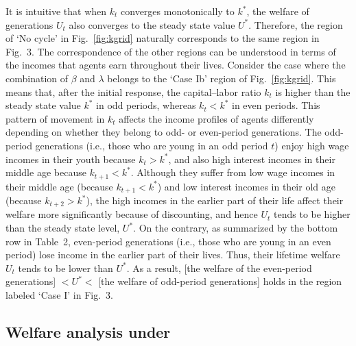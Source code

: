\documentclass{MBE}%
\begin{document}
{It is intuitive that when $k_{t}$ converges monotonically to $k^{\ast}$, the welfare of
generations $U_{t}$ also converges to the steady state value $U^{\ast}$. Therefore, the region of
`No cycle' in Fig.\ \ref{fig:kgrid} naturally corresponds to the same region in Fig.~3. The
correspondence of the other regions can be understood in terms of the incomes that agents earn
throughout their lives. Consider the case where the combination of $\beta$ and $\lambda$ belongs
to the `Case Ib' region of Fig.\ \ref{fig:kgrid}. This means that, after the initial response, the
capital--labor ratio $k_{t}$ is higher than the steady state value $k^{\ast}$ in odd periods,
whereas $k_{t}<k^{\ast}$ in even periods. This pattern of movement in $k_{t}$ affects the income
profiles of agents differently depending on whether they belong to odd- or even-period
generations. The odd-period generations (i.e., those who are young in an odd period $t$) enjoy
high wage incomes in their youth because $k_{t}>k^{\ast}$, and also high interest incomes in their
middle age because $k_{t+1}<k^{\ast}$. Although they suffer from low wage incomes in their middle
age (because $k_{t+1}<k^{\ast}$) and low interest incomes in their old age (because
$k_{t+2}>k^{\ast}$), the high incomes in the earlier part of their life affect their welfare more
significantly because of discounting, and hence $U_{t}$ tends to be higher than the steady state
level, $U^{\ast}$. On the contrary, as summarized by the bottom row in Table~2, even-period
generations (i.e., those who are young in an even period) lose income in the earlier part of their
lives. Thus, their lifetime welfare $U_{t}$ tends to be lower than $U^{\ast}$. As a result, [the
welfare of the even-period generations] $<U^{\ast}<$ [the welfare of odd-period generations] holds
in the region labeled `Case I' in Fig.~3.

\subsection{Welfare analysis under \label{subsec:numerical_u}%
}


}
\end{document}
